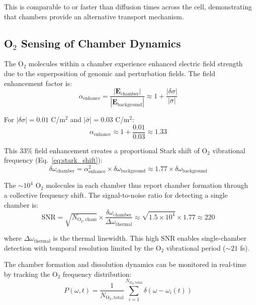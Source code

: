 \documentclass[twocolumn,10pt,aps,prd,superscriptaddress,floatfix,nofootinbib]{revtex4-2}
\theoremstyle{remark}
\begin{document}
This is comparable to or faster than diffusion times across the cell, demonstrating that chambers provide an alternative transport mechanism.

\subsection{O$_2$ Sensing of Chamber Dynamics}
\label{subsec:chamber_sensing}

The O$_2$ molecules within a chamber experience enhanced electric field strength due to the superposition of genomic and perturbation fields. The field enhancement factor is:
\begin{equation}
\alpha_{\mathrm{enhance}} = \frac{|\mathbf{E}_{\mathrm{chamber}}|}{|\mathbf{E}_{\mathrm{background}}|} \approx 1 + \frac{|\delta\sigma|}{|\bar{\sigma}|}
\end{equation}

For $|\delta\sigma| = 0.01$ C/m$^2$ and $|\bar{\sigma}| = 0.03$ C/m$^2$:
\begin{equation}
\alpha_{\mathrm{enhance}} \approx 1 + \frac{0.01}{0.03} \approx 1.33
\end{equation}

This 33\% field enhancement creates a proportional Stark shift of O$_2$ vibrational frequency (Eq.~\ref{eq:stark_shift}):
\begin{equation}
\delta\omega_{\mathrm{chamber}} = \alpha_{\mathrm{enhance}}^2 \times \delta\omega_{\mathrm{background}} \approx 1.77 \times \delta\omega_{\mathrm{background}}
\end{equation}

The $\sim 10^4$ O$_2$ molecules in each chamber thus report chamber formation through a collective frequency shift. The signal-to-noise ratio for detecting a single chamber is:
\begin{equation}
\mathrm{SNR} = \sqrt{N_{\mathrm{O_2,cham}}} \times \frac{\delta\omega_{\mathrm{chamber}}}{\Delta\omega_{\mathrm{thermal}}} \approx \sqrt{1.5 \times 10^{4}} \times 1.77 \approx 220
\end{equation}

where $\Delta\omega_{\mathrm{thermal}}$ is the thermal linewidth. This high SNR enables single-chamber detection with temporal resolution limited by the O$_2$ vibrational period ($\sim 21$ fs).

The chamber formation and dissolution dynamics can be monitored in real-time by tracking the O$_2$ frequency distribution:
\begin{equation}
P(\omega, t) = \frac{1}{N_{\mathrm{O_2,total}}} \sum_{i=1}^{N_{\mathrm{O_2,total}}} \delta(\omega - \omega_i(t))
\end{equation}
\end{document}

